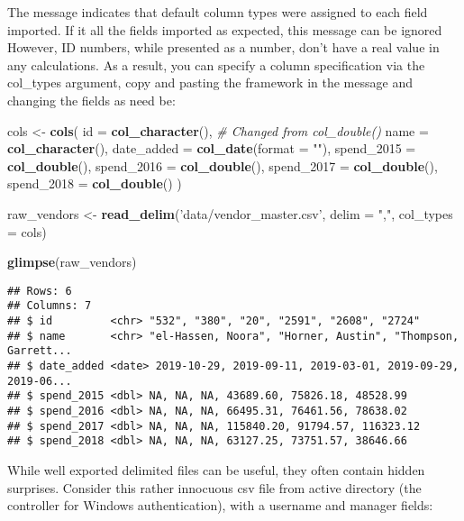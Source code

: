 \documentclass[
]{book}
\newenvironment{Shaded}{\begin{snugshade}}{\end{snugshade}}
\newcommand{\CommentTok}[1]{\textcolor[rgb]{0.56,0.35,0.01}{\textit{#1}}}
\newcommand{\DataTypeTok}[1]{\textcolor[rgb]{0.13,0.29,0.53}{#1}}
\newcommand{\KeywordTok}[1]{\textcolor[rgb]{0.13,0.29,0.53}{\textbf{#1}}}
\newcommand{\NormalTok}[1]{#1}
\newcommand{\StringTok}[1]{\textcolor[rgb]{0.31,0.60,0.02}{#1}}
\begin{document}
The message indicates that default column types were assigned to each field imported. If it all the fields imported as expected, this message can be ignored However, ID numbers, while presented as a number, don't have a real value in any calculations. As a result, you can specify a column specification via the col\_types argument, copy and pasting the framework in the message and changing the fields as need be:

\begin{Shaded}
\begin{Highlighting}[]
\NormalTok{cols <-}\StringTok{ }\KeywordTok{cols}\NormalTok{(}
  \DataTypeTok{id =} \KeywordTok{col_character}\NormalTok{(), }\CommentTok{# Changed from col_double()}
  \DataTypeTok{name =} \KeywordTok{col_character}\NormalTok{(),}
  \DataTypeTok{date_added =} \KeywordTok{col_date}\NormalTok{(}\DataTypeTok{format =} \StringTok{""}\NormalTok{),}
  \DataTypeTok{spend_2015 =} \KeywordTok{col_double}\NormalTok{(),}
  \DataTypeTok{spend_2016 =} \KeywordTok{col_double}\NormalTok{(),}
  \DataTypeTok{spend_2017 =} \KeywordTok{col_double}\NormalTok{(),}
  \DataTypeTok{spend_2018 =} \KeywordTok{col_double}\NormalTok{()}
\NormalTok{)}

\NormalTok{raw_vendors <-}\StringTok{ }\KeywordTok{read_delim}\NormalTok{(}\StringTok{'data/vendor_master.csv'}\NormalTok{, }\DataTypeTok{delim =} \StringTok{","}\NormalTok{, }\DataTypeTok{col_types =}\NormalTok{ cols)}

\KeywordTok{glimpse}\NormalTok{(raw_vendors)}
\end{Highlighting}
\end{Shaded}

\begin{verbatim}
## Rows: 6
## Columns: 7
## $ id         <chr> "532", "380", "20", "2591", "2608", "2724"
## $ name       <chr> "el-Hassen, Noora", "Horner, Austin", "Thompson, Garrett...
## $ date_added <date> 2019-10-29, 2019-09-11, 2019-03-01, 2019-09-29, 2019-06...
## $ spend_2015 <dbl> NA, NA, NA, 43689.60, 75826.18, 48528.99
## $ spend_2016 <dbl> NA, NA, NA, 66495.31, 76461.56, 78638.02
## $ spend_2017 <dbl> NA, NA, NA, 115840.20, 91794.57, 116323.12
## $ spend_2018 <dbl> NA, NA, NA, 63127.25, 73751.57, 38646.66
\end{verbatim}

While well exported delimited files can be useful, they often contain hidden surprises. Consider this rather innocuous csv file from active directory (the controller for Windows authentication), with a username and manager fields:
\end{document}
